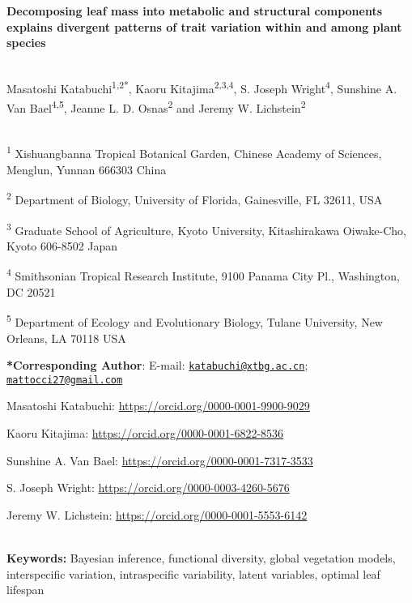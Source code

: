 \documentclass[
  12pt,
  letterpaper,
  DIV=11,
  numbers=noendperiod]{scrartcl}
\author{}
\date{}
\begin{document}
\ifdefined\Shaded\renewenvironment{Shaded}{\begin{tcolorbox}[breakable, boxrule=0pt, interior hidden, frame hidden, enhanced, borderline west={3pt}{0pt}{shadecolor}, sharp corners]}{\end{tcolorbox}}\fi

\textbf{Decomposing leaf mass into metabolic and structural components
explains divergent patterns of trait variation within and among plant
species}\\
\strut \\
Masatoshi Katabuchi\textsuperscript{1,2*}, Kaoru
Kitajima\textsuperscript{2,3,4}, S. Joseph Wright\textsuperscript{4},
Sunshine A. Van Bael\textsuperscript{4,5}, Jeanne L. D.
Osnas\textsuperscript{2} and Jeremy W. Lichstein\textsuperscript{2}\\
\strut \\
\textsuperscript{1} Xishuangbanna Tropical Botanical Garden, Chinese
Academy of Sciences, Menglun, Yunnan 666303 China

\textsuperscript{2} Department of Biology, University of Florida,
Gainesville, FL 32611, USA

\textsuperscript{3} Graduate School of Agriculture, Kyoto University,
Kitashirakawa Oiwake-Cho, Kyoto 606-8502 Japan

\textsuperscript{4} Smithsonian Tropical Research Institute, 9100 Panama
City Pl., Washington, DC 20521

\textsuperscript{5} Department of Ecology and Evolutionary Biology,
Tulane University, New Orleans, LA 70118 USA

\textbf{*Corresponding Author}: E-mail:
\href{mailto:katabuchi@xtbg.ac.cn}{\nolinkurl{katabuchi@xtbg.ac.cn}};
\href{mailto:mattocci27@gmail.com}{\nolinkurl{mattocci27@gmail.com}}

Masatoshi Katabuchi: \url{https://orcid.org/0000-0001-9900-9029}

Kaoru Kitajima: \url{https://orcid.org/0000-0001-6822-8536}

Sunshine A. Van Bael: \url{https://orcid.org/0000-0001-7317-3533}

S. Joseph Wright: \url{https://orcid.org/0000-0003-4260-5676}

Jeremy W. Lichstein: \url{https://orcid.org/0000-0001-5553-6142}\\
\strut \\
\textbf{Keywords:} Bayesian inference, functional diversity, global
vegetation models, interspecific variation, intraspecific variability,
latent variables, optimal leaf lifespan
\end{document}
